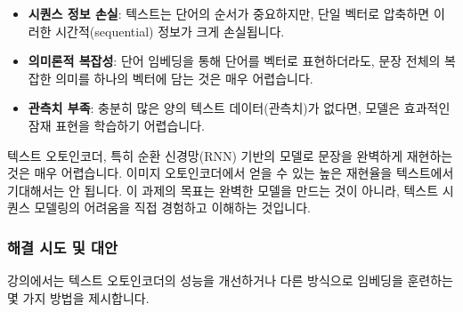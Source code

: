 \documentclass[11pt,a4paper]{article}
\theoremstyle{definition}
\begin{document}
\begin{itemize}
    \item \textbf{시퀀스 정보 손실}: 텍스트는 단어의 순서가 중요하지만, 단일 벡터로 압축하면 이러한 시간적(sequential) 정보가 크게 손실됩니다.
    \item \textbf{의미론적 복잡성}: 단어 임베딩을 통해 단어를 벡터로 표현하더라도, 문장 전체의 복잡한 의미를 하나의 벡터에 담는 것은 매우 어렵습니다.
    \item \textbf{관측치 부족}: 충분히 많은 양의 텍스트 데이터(관측치)가 없다면, 모델은 효과적인 잠재 표현을 학습하기 어렵습니다.
\end{itemize}

\begin{tcolorbox}[caution={완벽한 재현에 대한 기대}]
텍스트 오토인코더, 특히 순환 신경망(RNN) 기반의 모델로 문장을 완벽하게 재현하는 것은 매우 어렵습니다. 이미지 오토인코더에서 얻을 수 있는 높은 재현율을 텍스트에서 기대해서는 안 됩니다. 이 과제의 목표는 완벽한 모델을 만드는 것이 아니라, 텍스트 시퀀스 모델링의 어려움을 직접 경험하고 이해하는 것입니다.
\end{tcolorbox}

\subsubsection{해결 시도 및 대안}
강의에서는 텍스트 오토인코더의 성능을 개선하거나 다른 방식으로 임베딩을 훈련하는 몇 가지 방법을 제시합니다.
\end{document}

